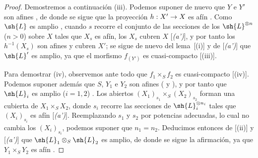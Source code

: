 \documentclass[oneside,10pt]{amsart}
\makeatletter
\newcommand{\ega@arrow}[2]{\mathchoice{#1}{#2}{#2}{#2}}
\renewcommand{\to}{\ega@arrow{\longrightarrow}{\rightarrow}}
\makeatother
\begin{document}
\begin{proof}
Demostremos a continuación (iii).
Podemos suponer de nuevo que $Y$ e $Y'$ son afines , de donde se sigue que la proyección $h:X'\to X$ es afín .
Como $\sh{L}$ es amplio , cuando $s$ recorre el conjunto de las secciones de los $\sh{L}^{\otimes n}$ ($n>0$) sobre $X$ tales que $X_s$ es afín, los $X_s$ cubren $X$ [\emph{(a')}], y por tanto los $h^{-1}(X_s)$ son afines  y cubren $X'$;
se sigue de nuevo del lema~[(i)] y de [\emph{(a')}] que $\sh{L}'$ es amplio, ya que el morfismo $f_{(Y')}$ es cuasi-compacto [(iii)].

Para demostrar (iv), observemos ante todo que $f_1\times_S f_2$ es cuasi-compacto [(iv)].
Podemos suponer además que $S$, $Y_1$ e $Y_2$ son afines ( y ), y por tanto que $\sh{L}_i$ es amplio ($i=1,2$) .
Los abiertos $(X_1)_{s_1}\times_S(X_2)_{s_2}$ forman una cubierta de $X_1\times_S X_2$, donde $s_i$ recorre las secciones de $\sh{L}_i^{\otimes n_i}$ tales que $(X_i)_{s_i}$ es afín [\emph{(a')}].
Reemplazando $s_1$ y $s_2$ por potencias adecuadas, lo cual no cambia los $(X_i)_{s_i}$, podemos suponer que $n_1=n_2$.
Deducimos entonces de [(ii)] y [\emph{(a')}] que $\sh{L}_1\otimes_S\sh{L}_2$ es amplio, de donde se sigue la afirmación, ya que $Y_1\times_S Y_2$ es afín .


\end{proof}
\end{document}
